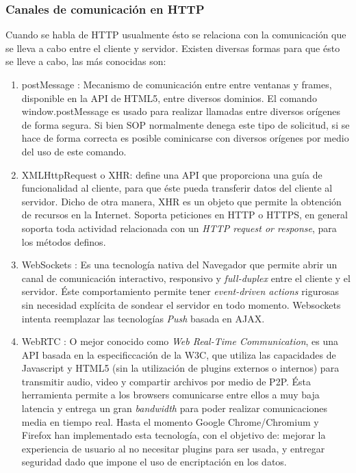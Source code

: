         \subsubsection{Canales de comunicación en HTTP}
        \label{chap2:comunHTTP}
        Cuando se habla de HTTP usualmente ésto se relaciona con la comunicación que se lleva a cabo entre el cliente y servidor. Existen diversas formas para que ésto se lleve a cabo, las más conocidas son:
        \begin{enumerate}
            \item postMessage \cite{webMessaging}: Mecanismo de comunicación entre entre ventanas y frames, disponible en la API de HTML5, entre diversos dominios. El comando window.postMessage es usado para realizar llamadas entre diversos orígenes de forma segura. Si bien SOP normalmente denega este tipo de solicitud, si se hace de forma correcta es posible cominicarse con diversos orígenes por medio del uso de este comando.

            \item XMLHttpRequest o XHR: \cite{XHR} define una API que proporciona una guía de funcionalidad al cliente, para que éste pueda transferir datos del cliente al servidor. Dicho de otra manera, XHR es un objeto que permite la obtención de recursos en la Internet. Soporta peticiones en HTTP o HTTPS, en general soporta toda actividad relacionada con un \textit{HTTP request or response}, para los métodos definos.

            \item WebSockets \cite{WebSocket}: Es una tecnología nativa del Navegador que permite abrir un canal de comunicación interactivo, responsivo y \textit{full-duplex} entre el cliente y el servidor. Éste comportamiento permite tener \textit{event-driven actions} rigurosas sin necesidad explícita de sondear el servidor en todo momento. Websockets intenta reemplazar las tecnologías \textit{Push} basada en AJAX.

            \item WebRTC \cite{WebRTC}: O mejor conocido como \textit{Web Real-Time Communication}, es una API basada en la especificcación de la W3C, que utiliza las capacidades de Javascript y HTML5 (sin la utilización de plugins externos o internos) para transmitir audio, video y compartir archivos por medio de P2P. Ésta herramienta permite a los browsers comunicarse entre ellos a muy baja latencia y entrega un gran \textit{bandwidth} para poder realizar comunicaciones media en tiempo real. Hasta el momento Google Chrome/Chromium y Firefox han implementado esta tecnología, con el objetivo de: mejorar la experiencia de usuario al no necesitar plugins para ser usada, y entregar seguridad dado que impone el uso de encriptación en los datos.
        \end{enumerate}

